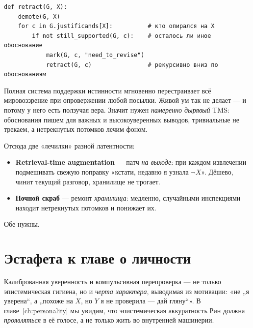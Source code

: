 \begin{lstlisting}[style=pseudo]
def retract(G, X):
    demote(G, X)
    for c in G.justificands[X]:          # кто опирался на X
        if not still_supported(G, c):    # осталось ли иное обоснование
            mark(G, c, "need_to_revise")
            retract(G, c)                # рекурсивно вниз по обоснованиям
\end{lstlisting}

\begin{intuition}
Полная система поддержки истинности мгновенно перестраивает всё мировоззрение при
опровержении любой посылки. Живой ум так не делает — и потому у него есть ползучая
вера. Значит нужен \emph{намеренно дырявый} TMS: обоснования пишем для важных и
высокоуверенных выводов, тривиальные не трекаем, а нетрекнутых потомков лечим
фоном.
\end{intuition}

Отсюда две «лечилки» разной латентности:
\begin{itemize}
\item \textbf{Retrieval-time augmentation} — патч \emph{на выходе}: при каждом
извлечении подмешивать свежую поправку «кстати, недавно я узнала $\neg X$». Дёшево,
чинит текущий разговор, хранилище не трогает.
\item \textbf{Ночной скраб} — ремонт \emph{хранилища}: медленно, случайными
инспекциями находит нетрекнутых потомков и понижает их.
\end{itemize}
Обе нужны.

\section{Эстафета к главе о личности}

Калиброванная уверенность и компульсивная перепроверка — не только эпистемическая
гигиена, но и \emph{черта характера}, выводимая из мотивации: «не „я уверена“, а
„похоже на $X$, но $Y$ я не проверила — дай гляну“». В главе~\ref{ch:personality}
мы увидим, что эпистемическая аккуратность Рин должна \emph{проявляться} в её
голосе, а не только жить во внутренней машинерии.
